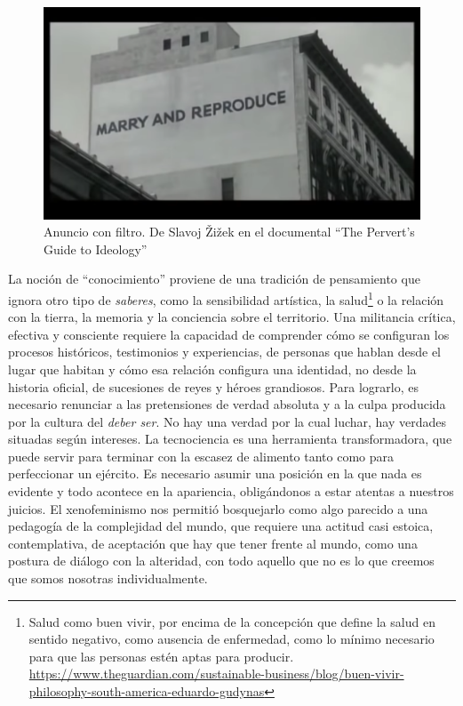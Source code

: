 \begin{figure}[htbp]
	\centering
	\includegraphics[width=.9\linewidth]{images/ideology2.png}
	\caption[Anuncio con filtro.]{Anuncio con filtro. De Slavoj Žižek en el documental \enquote{The Pervert's Guide to Ideology}}
\end{figure}

La noción de \enquote{conocimiento} proviene de una tradición de pensamiento que ignora otro tipo de \emph{saberes}, como la sensibilidad artística, la salud\footnote{Salud como buen vivir, por encima de la concepción que define la salud en sentido negativo, como ausencia de enfermedad, como lo mínimo necesario para que las personas estén aptas para producir. \url{https://www.theguardian.com/sustainable-business/blog/buen-vivir-philosophy-south-america-eduardo-gudynas}} o la relación con la tierra, la memoria y la conciencia sobre el territorio. Una militancia crítica, efectiva y consciente requiere la capacidad de comprender cómo se configuran los procesos históricos, testimonios y experiencias, de personas que hablan desde el lugar que habitan y cómo esa relación configura una identidad, no desde la historia oficial, de sucesiones de reyes y héroes grandiosos. Para lograrlo, es necesario renunciar a las pretensiones de verdad absoluta y a la culpa producida por la cultura del \emph{deber ser}. No hay una verdad por la cual luchar, hay verdades situadas según intereses. La tecnociencia es una herramienta transformadora, que puede servir para terminar con la escasez de alimento tanto como para perfeccionar un ejército. Es necesario asumir una posición en la que nada es evidente y todo acontece en la apariencia, obligándonos a estar atentas a nuestros juicios. El xenofeminismo nos permitió bosquejarlo como algo parecido a una pedagogía de la complejidad del mundo, que requiere una actitud casi estoica, contemplativa, de aceptación que hay que tener frente al mundo, como una postura de diálogo con la alteridad, con todo aquello que no es lo que creemos que somos nosotras individualmente.

